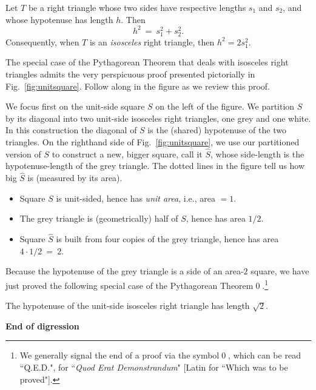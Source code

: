 \begin{theorem}
\label{thm:Pythagorean-thm}
Let $T$ be a right triangle whose two sides have respective lengths $s_1$ and $s_2$, and whose hypotenuse has length $h$.  Then
\[ h^2 \ = \ s_1^2 + s_2^2. \]
Consequently, when $T$ is an {\em isosceles} right triangle, then $h^2 = 2 s_1^2$.
\end{theorem}

The special case of the Pythagorean Theorem that deals with isosceles right triangles admits the very perspicuous proof presented pictorially in Fig.~\ref{fig:unitsquare}.  Follow along in the figure as we review this proof.

\smallskip

We focus first on the unit-side square $S$ on the left of the figure.  We partition $S$ by its diagonal into two unit-side isosceles right triangles, one grey and one white.  In this construction the diagonal of $S$ is the (shared) hypotenuse of the two triangles.  On the righthand side of Fig.~\ref{fig:unitsquare}, we use our partitioned version of $S$ to construct a new, bigger square, call it $\widehat{S}$, whose side-length is the hypotenuse-length of the grey triangle.  The dotted lines in the figure tell us how big $\widehat{S}$ is (measured by its area).
\begin{itemize}
\item
Square $S$ is unit-sided, hence has {\em unit area}, i.e., area $=1$.
\item
The grey triangle is (geometrically) half of $S$, hence has area $1/2$.
\item
Square $\widehat{S}$ is built from four copies of the grey triangle, hence has area $4 \cdot 1/2 \ = \ 2$.
\end{itemize}
Because the hypotenuse of the grey triangle is a side of an area-$2$ square, we have just proved the following special case of the Pythagorean Theorem\qed.\footnote{We generally signal the end of a proof via the symbol\qed, which can be read ``Q.E.D.", for ``{\em Quod Erat Demonstrandum}" [Latin for ``Which was to be proved"].}

\begin{prop}
\label{thm:unit-isosceles-PythThm}
The hypotenuse of the unit-side isosceles right triangle has length $\sqrt{2}$.
\end{prop}
  
\noindent \textbf{End of digression}

\bigskip


